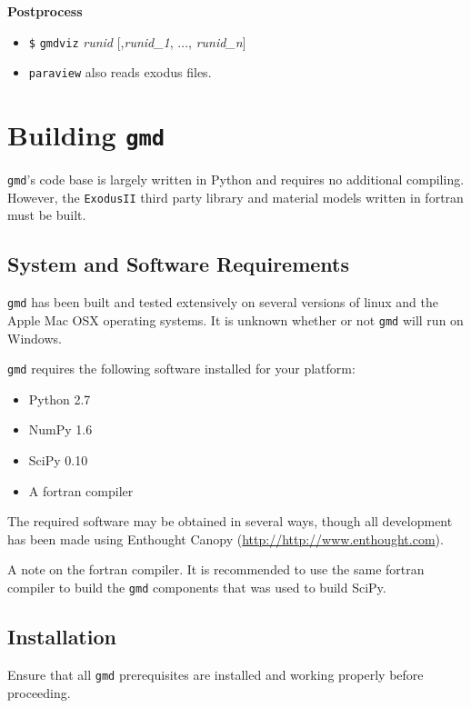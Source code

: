 \documentclass[11pt]{report}
\newcommand{\gmd}{\texttt{gmd}}
\newcommand{\gmdviz}{\texttt{gmdviz}}
\newcommand{\exodusii}{{\sc\texttt{ExodusII}}}
\newcommand{\paraview}[1]{{\sc\texttt{paraview}}}
\newcommand{\prompt}{\texttt{\$}}
\newcommand{\boldnoindent}[1]{\noindent\textbf{#1}}
\begin{document}
\boldnoindent{Postprocess}
\begin{itemize}
  \item \prompt{} \gmdviz{} \emph{runid} [,\emph{runid\_1}, $\ldots$,
  \emph{runid\_n}]
  \item \paraview{} also reads exodus files.
\end{itemize}


\chapter{Building \gmd{}}
\label{chap:build}
\gmd{}'s code base is largely written in Python and requires no additional
compiling.  However, the \exodusii{} third party library and material models
written in fortran must be built.

\section{System and Software Requirements}
\gmd{} has been built and tested extensively on several versions of linux and
the Apple Mac OSX operating systems. It is unknown whether or not \gmd{}
will run on Windows.

\gmd{} requires the following software installed for your platform:

\begin{itemize}
  \item Python 2.7
  \item NumPy 1.6
  \item SciPy 0.10
  \item A fortran compiler
\end{itemize}

The required software may be obtained in several ways, though all development
has been made using Enthought Canopy (\url{http://http://www.enthought.com}).

A note on the fortran compiler.  It is recommended to use the same fortran
compiler to build the \gmd{} components that was used to build SciPy.

\section{Installation}
Ensure that all \gmd{} prerequisites are installed and working properly before
proceeding.
\end{document}
